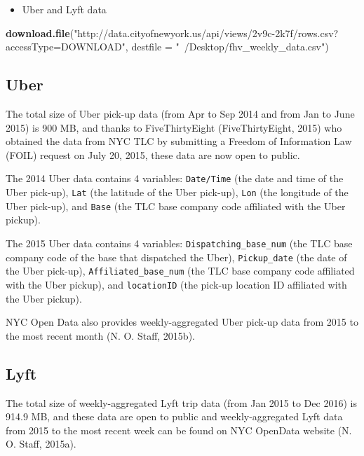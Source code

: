 \documentclass[12pt,twoside]{reedthesis}
\newenvironment{Shaded}{\begin{snugshade}}{\end{snugshade}}
\newcommand{\KeywordTok}[1]{\textcolor[rgb]{0.13,0.29,0.53}{\textbf{#1}}}
\newcommand{\DataTypeTok}[1]{\textcolor[rgb]{0.13,0.29,0.53}{#1}}
\newcommand{\StringTok}[1]{\textcolor[rgb]{0.31,0.60,0.02}{#1}}
\newcommand{\NormalTok}[1]{#1}
\providecommand{\tightlist}{%
  \setlength{\itemsep}{0pt}\setlength{\parskip}{0pt}}
\theoremstyle{definition}
\theoremstyle{definition}
\theoremstyle{definition}
\theoremstyle{remark}
\begin{document}
\begin{itemize}
\tightlist
\item
  Uber and Lyft data
\end{itemize}
\begin{Shaded}
\begin{Highlighting}[]
\KeywordTok{download.file}\NormalTok{(}\StringTok{"http://data.cityofnewyork.us/api/views/2v9c-2k7f/rows.csv?accessType=DOWNLOAD"}\NormalTok{, }\DataTypeTok{destfile =} \StringTok{"~/Desktop/fhv_weekly_data.csv"}\NormalTok{)}
\end{Highlighting}
\end{Shaded}
\subsection{Uber}\label{uber-1}

The total size of Uber pick-up data (from Apr to Sep 2014 and from Jan
to June 2015) is 900 MB, and thanks to FiveThirtyEight (FiveThirtyEight,
2015) who obtained the data from NYC TLC by submitting a Freedom of
Information Law (FOIL) request on July 20, 2015, these data are now open
to public.

The 2014 Uber data contains 4 variables: \texttt{Date/Time} (the date
and time of the Uber pick-up), \texttt{Lat} (the latitude of the Uber
pick-up), \texttt{Lon} (the longitude of the Uber pick-up), and
\texttt{Base} (the TLC base company code affiliated with the Uber
pickup).

The 2015 Uber data contains 4 variables: \texttt{Dispatching\_base\_num}
(the TLC base company code of the base that dispatched the Uber),
\texttt{Pickup\_date} (the date of the Uber pick-up),
\texttt{Affiliated\_base\_num} (the TLC base company code affiliated
with the Uber pickup), and \texttt{locationID} (the pick-up location ID
affiliated with the Uber pickup).

NYC Open Data also provides weekly-aggregated Uber pick-up data from
2015 to the most recent month (N. O. Staff, 2015b).

\subsection{Lyft}\label{lyft-1}

The total size of weekly-aggregated Lyft trip data (from Jan 2015 to Dec
2016) is 914.9 MB, and these data are open to public and
weekly-aggregated Lyft data from 2015 to the most recent week can be
found on NYC OpenData website (N. O. Staff, 2015a).
\end{document}
